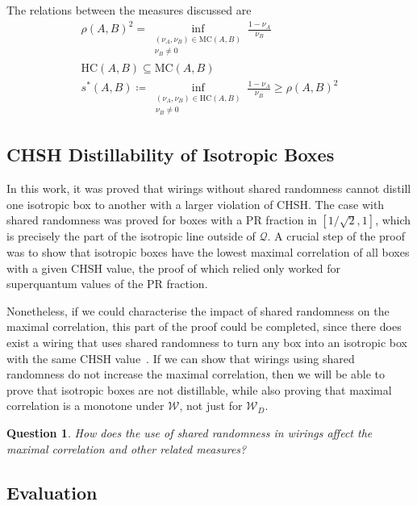 \documentclass[10pt, a4paper]{article}
\numberwithin{equation}{section} %
\theoremstyle{definition}
\theoremstyle{plain}
\newtheorem{question}{Question}
\newcommand{\?}{\mathrel{?}} %
\newcommand{\sW}{\mathcal{W}}
\newcommand{\HC}{\mathrm{HC}}
\newcommand{\MC}{\mathrm{MC}}
\newcommand{\Qs}{\mathcal{Q}}
\begin{document}
    The relations between the measures discussed are
    \begin{gather}
      {\rho(A,B)}^2 = \inf_{\substack{(\nu_A, \nu_B) \in \MC(A,B) \\ \nu_B \neq 0}} \frac{1 - \nu_A}{\nu_B} \\
      \HC(A,B) \subseteq \MC(A,B) \\
      s^*(A,B) \coloneqq \inf_{\substack{(\nu_A, \nu_B) \in \HC(A,B) \\ \nu_B \neq 0}} \frac{1 - \nu_A}{\nu_B} \geq {\rho(A,B)}^2
    \end{gather}

    \subsection{CHSH Distillability of Isotropic Boxes}\label{sec:nlmono_isodist}

    In this work, it was proved that wirings without shared randomness cannot distill one isotropic box to another with a larger violation of CHSH. The case with shared randomness was proved for boxes with a PR fraction in \([1/\sqrt{2}, 1]\), which is precisely the part of the isotropic line outside of \(\Qs\). A crucial step of the proof was to show that isotropic boxes have the lowest maximal correlation of all boxes with a given CHSH value, the proof of which relied only worked for superquantum values of the PR fraction.

    Nonetheless, if we could characterise the impact of shared randomness on the maximal correlation, this part of the proof could be completed, since there does exist a wiring that uses shared randomness to turn any box into an isotropic box with the same CHSH value~\cite{NSTheories}. If we can show that wirings using shared randomness do not increase the maximal correlation, then we will be able to prove that isotropic boxes are not distillable, while also proving that maximal correlation is a monotone under \(\sW\), not just for \(\sW_D\).

    \begin{question}
      How does the use of shared randomness in wirings affect the maximal correlation and other related measures?
    \end{question}

    \subsection{Evaluation}
\end{document}
